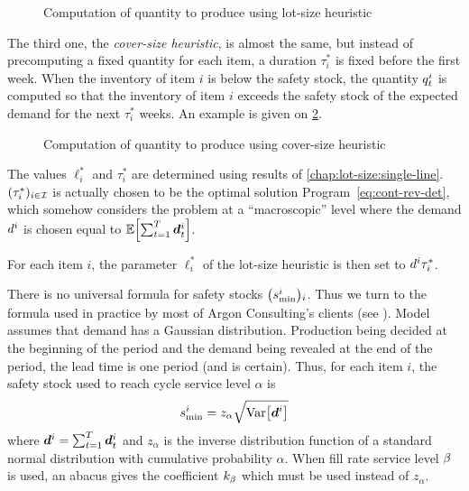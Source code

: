 \begin{figure}[h]
  \centering
  \caption{Computation of quantity to produce using lot-size heuristic}
  \label{fig:lot-size-production}
\end{figure}


The third one, the {\em cover-size heuristic}, is almost the same, but instead of precomputing a fixed quantity for each item, a duration $\tau_i^*$ is fixed before the first week.
When the inventory of item $i$ is below the safety stock, the quantity $q_t^i$ is computed so that the inventory of item $i$ exceeds the safety stock of the expected demand for the next $\tau_i^*$ weeks.
An example is given on \cref{fig:cover-size-production}.

\begin{figure}[h]
  \centering
  \caption{Computation of quantity to produce using cover-size heuristic}
  \label{fig:cover-size-production}
\end{figure}


The values $\ell_i^*$ and $\tau_i^*$ are determined using results of \cref{chap:lot-size:single-line}.
$(\tau_i^*)_{i\in\mathcal{I}}$ is actually chosen to be the optimal solution Program~\eqref{eq:cont-rev-det}, which somehow considers the problem at a ``macroscopic'' level
where the demand $d^i$ is chosen equal to $\espe\sqbracket{\sum_{t=1}^{\horizon}\va d_t^i}$.

For each item $i$, the parameter $\ell_i^*$ of the lot-size heuristic is then set to $d^i\tau_i^*$.


There is no universal formula for safety stocks $\bracket{\safety^i}_i$.
Thus we turn to the formula used in practice by most of Argon Consulting's clients (see \cite[Chapter 11]{arnold2007}).
Model assumes that demand has a Gaussian distribution.
Production being decided at the beginning of the period and the demand being revealed at the end of the period, the lead time is one period (and is certain).
Thus, for each item $i$, the safety stock used to reach cycle service level $\alpha$ is
\begin{equation}\label{eq:PDP:numerical-experiments:safety-stock}
  \safety^i = z_{\alpha} \sqrt{\vari\sqbracket{\va\demand^i}}
\end{equation}
where $\va\demand^i=\sum_{t=1}^{\horizon}\va\demand_t^i$ and $z_{\alpha}$ is the inverse distribution function of a standard normal distribution with cumulative probability $\alpha$.
When fill rate service level $\beta$ is used, an abacus gives the coefficient $k_{\beta}$ which must be used instead of $z_{\alpha}$.


